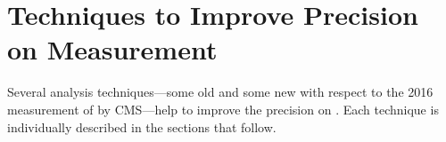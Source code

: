 \section{Techniques to Improve Precision on \mH Measurement}
\label{sec:techniques}

Several analysis techniques---some old and some new with respect to the 2016 measurement of \mH by CMS---help to improve the precision on \mH. %
Each technique is individually described in the sections that follow.





% 
